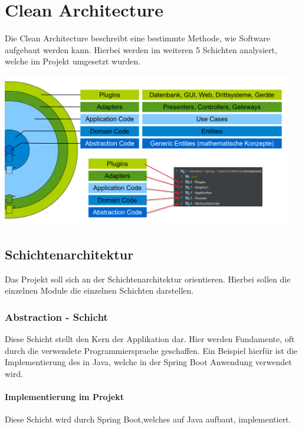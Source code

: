 
\chapter{Clean Architecture}
\label{cleanArchitecture}
    Die Clean Architecture beschreibt eine bestimmte Methode, wie Software aufgebaut werden kann. Hierbei werden im weiteren 5 Schichten analysiert, welche im Projekt umgesetzt wurden.
    
    \includegraphics[width=0.95\textwidth]{zfiles/Bilder/schichten.png}

    \section{Schichtenarchitektur}
     Das Projekt soll sich an der Schichtenarchitektur orientieren. Hierbei sollen die einzelnen Module die einzelnen Schichten darstellen.
    
        \subsection{Abstraction - Schicht}
    	Diese Schicht stellt den Kern der Applikation dar. Hier werden Fundamente, oft durch die verwendete Programmiersprache geschaffen. Ein Beispiel hierfür ist die Implementierung des  in Java, welche in der Spring Boot Anwendung verwendet wird.
    		\subsubsection{Implementierung im Projekt}
    		Diese Schicht wird durch Spring Boot,welches auf Java aufbaut, implementiert. 
    	
